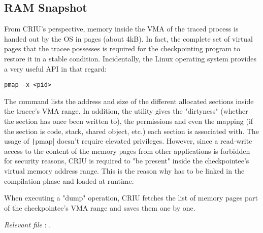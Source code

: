 \subsection*{RAM Snapshot}
From CRIU's perspective, memory inside the \gls{VMA} of the traced process is handed out by the OS in pages (about 4kB). In fact, the complete set of virtual pages that the tracee possesses is required for the checkpointing program to restore it in a stable condition. Incidentally, the Linux operating system provides a very useful API in that regard:
\begin{verbatim}
pmap -x <pid>
\end{verbatim}
The command lists the address and size of the different allocated sections inside the tracee's \gls{VMA} range. In addition, the utility gives the "dirtyness"  (whether the section has once been written to), the permissions and even the mapping (if the section is code, stack, shared object, etc.) each section is associated with. The usage of \texttt|pmap| doesn't require elevated privileges. However, since a read-write access to the content of the memory pages from other applications is forbidden for security reasons, CRIU is required to "be present" inside the checkpointee's virtual memory address range. This is the reason why  has to be linked in the compilation phase and loaded at runtime. 

When executing a "dump" operation, CRIU fetches the list of memory pages part of the checkpointee's VMA range and saves them one by one. 

\hfill\textit{Relevant file }: .